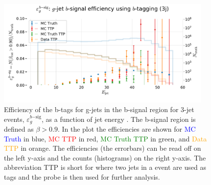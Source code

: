 \begin{figure}
  \centerfloat
  \includegraphics[width=0.95\textwidth, trim=0 0 0 35, clip]{figures/quarks/eff_g_bsig-down_sample=1.00-ML_vars=vertex-selection=b-ejet_min=4-n_iter_RS_lgb=99-n_iter_RS_xgb=9-cdot_cut=0.90-version=19.pdf}
  \caption[b-Tagging Efficiency $\varepsilon_g^{b\mathrm{-sig}}$ as a function of jet energy]
          {Efficiency of the b-tags for g-jets in the b-signal region for 3-jet events, $\varepsilon_g^{b\mathrm{-sig}}$, as a function of jet energy . The b-signal region is defined as $\beta > 0.9$. In the plot the efficiencies are shown for \textcolor{blue}{MC Truth} in blue, \textcolor{red}{MC TTP} in red, \textcolor{green}{MC Truth TTP} in green, and \textcolor{orange}{Data TTP} in orange. The efficiencies (the errorbars) can be read off on the left y-axis and the counts (histograms) on the right y-axis. The abbreviation TTP is short for  where two jets in a event are used as tags and the probe is then used for further analysis.  
          } 
  \label{fig:q:effiency_btag_gjet_bsig}
\end{figure}



